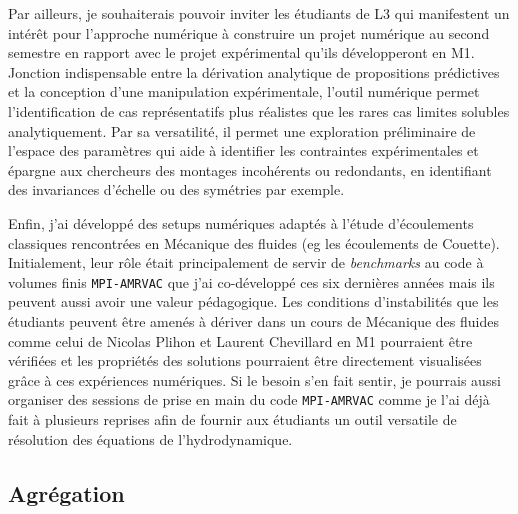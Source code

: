 \documentclass[11pt,onecolumn]{article}
\begin{document}
Par ailleurs, je souhaiterais pouvoir inviter les étudiants de L3 qui manifestent un intérêt pour l’approche numérique à construire un projet numérique au second semestre en rapport avec le projet expérimental qu’ils développeront en M1. Jonction indispensable entre la dérivation analytique de propositions prédictives et la conception d’une manipulation expérimentale, l’outil numérique permet l’identification de cas représentatifs plus réalistes que les rares cas limites solubles analytiquement. Par sa versatilité, il permet une exploration préliminaire de l’espace des paramètres qui aide à identifier les contraintes expérimentales et épargne aux chercheurs des montages incohérents ou redondants, en identifiant des invariances d’échelle ou des symétries par exemple. 

Enfin, j’ai développé des setups numériques adaptés à l’étude d’écoulements classiques rencontrées en Mécanique des fluides (eg les écoulements de Couette). Initialement, leur rôle était principalement de servir de \textit{benchmarks} au code à volumes finis \texttt{MPI-AMRVAC} que j’ai co-développé ces six dernières années mais ils peuvent aussi avoir une valeur pédagogique. Les conditions d’instabilités que les étudiants peuvent être amenés à dériver dans un cours de Mécanique des fluides comme celui de Nicolas Plihon et Laurent Chevillard en M1 pourraient être vérifiées et les propriétés des solutions pourraient être directement visualisées grâce à ces expériences numériques. Si le besoin s’en fait sentir, je pourrais aussi organiser des sessions de prise en main du code \texttt{MPI-AMRVAC} comme je l’ai déjà fait à plusieurs reprises afin de fournir aux étudiants un outil versatile de résolution des équations de l’hydrodynamique.

\subsection{Agrégation}
\end{document}
